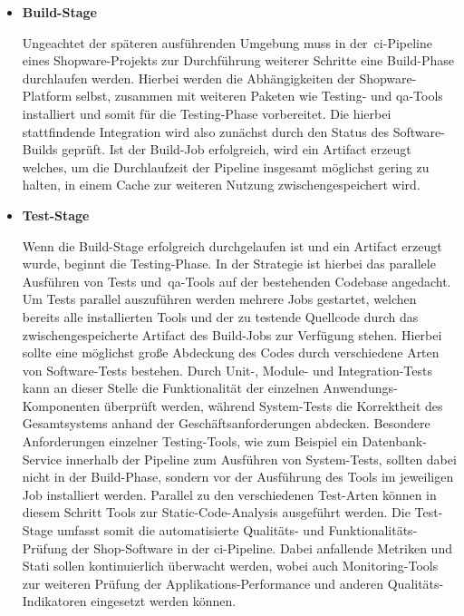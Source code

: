 \begin{itemize}
    \item {
        \textbf{Build-Stage}\par
        Ungeachtet der späteren ausführenden Umgebung muss in der\ \acrshort{ci}-Pipeline eines Shopware-Projekts zur
        Durchführung weiterer Schritte eine Build-Phase durchlaufen werden.
        Hierbei werden die Abhängigkeiten der Shopware-Platform selbst, zusammen mit weiteren Paketen wie Testing- und
        \acrshort{qa}-Tools installiert und somit für die Testing-Phase vorbereitet.
        Die hierbei stattfindende Integration wird also zunächst durch den Status des Software-Builds geprüft.
        Ist der Build-Job erfolgreich, wird ein Artifact erzeugt welches, um die Durchlaufzeit der Pipeline insgesamt
        möglichst gering zu halten, in einem Cache zur weiteren Nutzung zwischengespeichert wird.
    }

    \item {
        \textbf{Test-Stage}\par
        Wenn die Build-Stage erfolgreich durchgelaufen ist und ein Artifact erzeugt wurde, beginnt die Testing-Phase.
        In der Strategie ist hierbei das parallele Ausführen von Tests und\ \acrshort{qa}-Tools auf der bestehenden
        Codebase angedacht.
        Um Tests parallel auszuführen werden mehrere Jobs gestartet, welchen bereits alle installierten Tools
        und der zu testende Quellcode durch das zwischengespeicherte Artifact des Build-Jobs zur Verfügung stehen.
        Hierbei sollte eine möglichst große Abdeckung des Codes durch verschiedene Arten von Software-Tests bestehen.
        Durch Unit-, Module- und Integration-Tests kann an dieser Stelle die Funktionalität der einzelnen
        Anwendungs-Komponenten überprüft werden, während System-Tests die Korrektheit des Gesamtsystems anhand der
        Geschäftsanforderungen abdecken.
        Besondere Anforderungen einzelner Testing-Tools, wie zum Beispiel ein Datenbank-Service innerhalb der Pipeline
        zum Ausführen von System-Tests, sollten dabei nicht in der Build-Phase, sondern vor der Ausführung des Tools im
        jeweiligen Job installiert werden.
        Parallel zu den verschiedenen Test-Arten können in diesem Schritt Tools zur Static-Code-Analysis ausgeführt
        werden.
        Die Test-Stage umfasst somit die automatisierte Qualitäts- und Funktionalitäts-Prüfung der Shop-Software in der
        \acrshort{ci}-Pipeline.
        Dabei anfallende Metriken und Stati sollen kontinuierlich überwacht werden, wobei auch Monitoring-Tools zur
        weiteren Prüfung der Applikations-Performance und anderen Qualitäts-Indikatoren eingesetzt werden können.
    }


\end{itemize}
